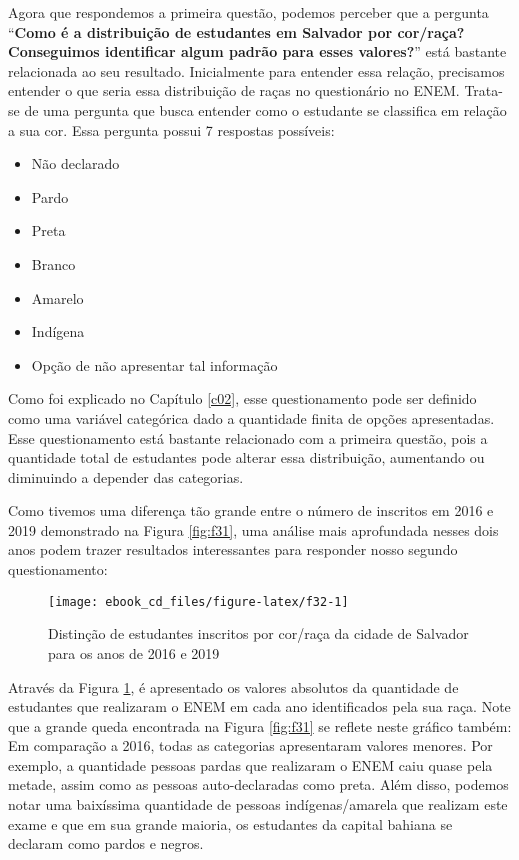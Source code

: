 \documentclass[
  oneside]{book}
\begin{document}
Agora que respondemos a primeira questão, podemos perceber que a pergunta ``\textbf{Como é a distribuição de estudantes em Salvador por cor/raça? Conseguimos identificar algum padrão para esses valores?}'' está bastante relacionada ao seu resultado.
Inicialmente para entender essa relação, precisamos entender o que seria essa distribuição de raças no questionário no ENEM. Trata-se de uma pergunta que busca entender como o estudante se classifica em relação a sua cor. Essa pergunta possui 7 respostas possíveis:

\begin{itemize}
\item
  Não declarado
\item
  Pardo
\item
  Preta
\item
  Branco
\item
  Amarelo
\item
  Indígena
\item
  Opção de não apresentar tal informação
\end{itemize}

Como foi explicado no Capítulo \ref{c02}, esse questionamento pode ser definido como uma variável categórica dado a quantidade finita de opções apresentadas. Esse questionamento está bastante relacionado com a primeira questão, pois a quantidade total de estudantes pode alterar essa distribuição, aumentando ou diminuindo a depender das categorias.

Como tivemos uma diferença tão grande entre o número de inscritos em 2016 e 2019 demonstrado na Figura \ref{fig:f31}, uma análise mais aprofundada nesses dois anos podem trazer resultados interessantes para responder nosso segundo questionamento:

\begin{figure}

{\centering \texttt{[image: ebook\_cd\_files/figure-latex/f32-1]} 

}

\caption{Distinção de estudantes inscritos por cor/raça da cidade de Salvador para os anos de 2016 e 2019}\label{fig:f32}
\end{figure}

Através da Figura \ref{fig:f32}, é apresentado os valores absolutos da quantidade de estudantes que realizaram o ENEM em cada ano identificados pela sua raça. Note que a grande queda encontrada na Figura \ref{fig:f31} se reflete neste gráfico também: Em comparação a 2016, todas as categorias apresentaram valores menores. Por exemplo, a quantidade pessoas pardas que realizaram o ENEM caiu quase pela metade, assim como as pessoas auto-declaradas como preta. Além disso, podemos notar uma baixíssima quantidade de pessoas indígenas/amarela que realizam este exame e que em sua grande maioria, os estudantes da capital bahiana se declaram como pardos e negros.
\end{document}

